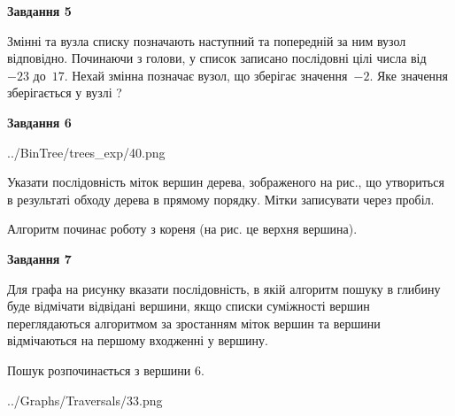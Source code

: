 \documentclass[12pt, ukrainian]{article}
\begin{document}
{\begin {large}
{\begin {center}\textbf{Завдання 5}\end {center}}\par
Змінні  та  вузла списку позначають наступний та попередній за ним вузол відповідно. Починаючи з голови, у список записано послідовні цілі числа від~$-23$ до~$17$. Нехай змінна  позначає вузол, що зберігає значення~$-2$.
Яке значення зберігається у вузлі  ?\par
\newpage

{\begin {center}\textbf{Завдання 6}\end {center}}\par

\begin{center}
	{../BinTree/trees_exp/40.png}
\end{center}
Указати послідовність міток вершин дерева, зображеного на рис., що утвориться в результаті обходу дерева в прямому порядку. Мітки записувати через пробіл.\par Алгоритм починає роботу з кореня (на рис. це верхня вершина).\par
\newpage

{\begin {center}\textbf{Завдання 7}\end {center}}\par
Для графа на рисунку вказати послідовність, в якій алгоритм пошуку в глибину буде відмічати відвідані вершини, якщо списки суміжності вершин переглядаються алгоритмом за зростанням міток вершин та вершини відмічаються на першому вход\-женні у вершину.\par
Пошук розпочинається з вершини 6.\par

\begin{center}
	{../Graphs/Traversals/33.png}
\end{center}\par
\newpage


\end{large}}
\end{document}
